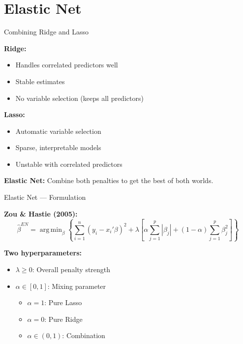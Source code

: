 \documentclass[10pt]{beamer}
\DeclareMathOperator*{\argmin}{arg\,min}
\begin{document}
\section{Elastic Net}

\begin{frame}{Combining Ridge and Lasso}

\textbf{Ridge:}
\begin{itemize}
  \item[$+$] Handles correlated predictors well
  \item[$+$] Stable estimates
  \item[$-$] No variable selection (keeps all predictors)
\end{itemize}

\vspace{0.5em}
\textbf{Lasso:}
\begin{itemize}
  \item[$+$] Automatic variable selection
  \item[$+$] Sparse, interpretable models
  \item[$-$] Unstable with correlated predictors
\end{itemize}

\vspace{1em}
\textbf{Elastic Net:} Combine both penalties to get the best of both worlds.

\end{frame}


\begin{frame}{Elastic Net --- Formulation}

\textbf{Zou \& Hastie (2005):}
\[
\widehat{\beta}^{EN} = \argmin_\beta \left\{ \sum_{i=1}^n (y_i - x_i'\beta)^2 + \lambda \left[ \alpha \sum_{j=1}^p |\beta_j| + (1-\alpha) \sum_{j=1}^p \beta_j^2 \right] \right\}
\]

\vspace{1em}
\textbf{Two hyperparameters:}
\begin{itemize}
  \item $\lambda \geq 0$: Overall penalty strength
  \item $\alpha \in [0, 1]$: Mixing parameter
  \begin{itemize}
    \item $\alpha = 1$: Pure Lasso
    \item $\alpha = 0$: Pure Ridge
    \item $\alpha \in (0,1)$: Combination
  \end{itemize}
\end{itemize}

\end{frame}
\end{document}
